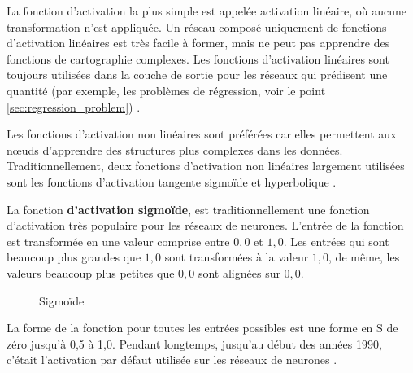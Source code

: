 	La fonction d'activation la plus simple est appelée activation linéaire, où aucune transformation n'est appliquée. Un réseau composé uniquement de fonctions d'activation linéaires est très facile à former, mais ne peut pas apprendre des fonctions de cartographie complexes. Les fonctions d'activation linéaires sont toujours utilisées dans la couche de sortie pour les réseaux qui prédisent une quantité (par exemple, les problèmes de régression, voir le point \ref{sec:regression_problem}) \cite{geron2017hands, krizhevsky2012imagenet}.
	
	Les fonctions d'activation non linéaires sont préférées car elles permettent aux nœuds d'apprendre des structures plus complexes dans les données. Traditionnellement, deux fonctions d'activation non linéaires largement utilisées sont les fonctions d'activation tangente sigmoïde et hyperbolique \cite{goodfellow2016deep}.
	
	La fonction \textbf{d'activation sigmoïde}, est traditionnellement une fonction d'activation très populaire pour les réseaux de neurones. L'entrée de la fonction est transformée en une valeur comprise entre $0,0$ et $1,0$. Les entrées qui sont beaucoup plus grandes que $1,0$ sont transformées à la valeur $1,0$, de même, les valeurs beaucoup plus petites que $0,0$ sont alignées sur $0,0$.\\ 
	\begin{figure}
		\caption[Sigmoïde graphique]{Sigmoïde}
		\label{fig:sigmoid-graph}
	\end{figure} 
	La forme de la fonction pour toutes les entrées possibles est une forme en S de zéro jusqu'à 0,5 à 1,0. Pendant longtemps, jusqu'au début des années 1990, c'était l'activation par défaut utilisée sur les réseaux de neurones \cite{krizhevsky2012imagenet}.
	
	
	
	

